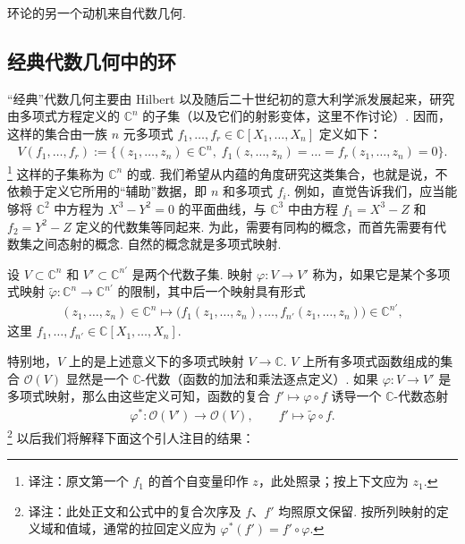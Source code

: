 环论的另一个动机来自代数几何.



\subsection{经典代数几何中的环}
\label{sec:galois-1-1-5}

``经典''代数几何主要由 Hilbert 以及随后二十世纪初的意大利学派发展起来，研究由多项式方程定义的 $\mathbb{C}^{n}$ 的子集（以及它们的射影变体，这里不作讨论）. 因而，这样的集合由一族 $n$ 元多项式 $f_1,\dots,f_r\in\mathbb{C}[X_1,\dots,X_n]$ 定义如下：
\begin{align*}
V(f_1,\dots,f_r)
 :=\bigl\{(z_1,\dots,z_n)\in\mathbb{C}^{n},\;
 f_1(z,\dots,z_n)=\dots=f_r(z_1,\dots,z_n)=0\bigr\}.
\end{align*}
\footnote{译注：原文第一个 $f_1$ 的首个自变量印作 $z$，此处照录；按上下文应为 $z_1$.}
这样的子集称为 $\mathbb{C}^{n}$ 的或. 我们希望从内蕴的角度研究这类集合，也就是说，不依赖于定义它所用的``辅助''数据，即 $n$ 和多项式 $f_i$. 例如，直觉告诉我们，应当能够将 $\mathbb{C}^{2}$ 中方程为 $X^3-Y^2=0$ 的平面曲线，与 $\mathbb{C}^{3}$ 中由方程 $f_1=X^3-Z$ 和 $f_2=Y^2-Z$ 定义的代数集等同起来. 为此，需要有同构的概念，而首先需要有代数集之间态射的概念. 自然的概念就是多项式映射.

\begin{definition*}
设 $V\subset\mathbb{C}^{n}$ 和 $V'\subset\mathbb{C}^{n'}$ 是两个代数子集. 映射 $\varphi\colon V\longrightarrow V'$ 称为，如果它是某个多项式映射 $\widetilde{\varphi}\colon\mathbb{C}^{n}\longrightarrow\mathbb{C}^{n'}$ 的限制，其中后一个映射具有形式
\begin{align*}
(z_1,\dots,z_n)\in\mathbb{C}^{n}
\longmapsto
\bigl(f_1(z_1,\dots,z_n),\dots,f_{n'}(z_1,\dots,z_n)\bigr)
\in\mathbb{C}^{n'},
\end{align*}
这里 $f_1,\dots,f_{n'}\in\mathbb{C}[X_1,\dots,X_n]$.
\end{definition*}

特别地，$V$ 上的是上述意义下的多项式映射 $V\longrightarrow\mathbb{C}$. $V$ 上所有多项式函数组成的集合 $\mathcal{O}(V)$ 显然是一个 $\mathbb{C}$-代数（函数的加法和乘法逐点定义）. 如果 $\varphi\colon V\longrightarrow V'$ 是多项式映射，那么由这些定义可知，函数的复合 $f'\longmapsto\varphi\circ f$ 诱导一个 $\mathbb{C}$-代数态射
\begin{align*}
\varphi^*\colon\mathcal{O}(V')\longrightarrow\mathcal{O}(V),
\qquad f'\longmapsto\widetilde{\varphi}\circ f.
\end{align*}
\footnote{译注：此处正文和公式中的复合次序及 $f$、$f'$ 均照原文保留. 按所列映射的定义域和值域，通常的拉回定义应为 $\varphi^*(f')=f'\circ\varphi$.}
以后我们将解释下面这个引人注目的结果：

